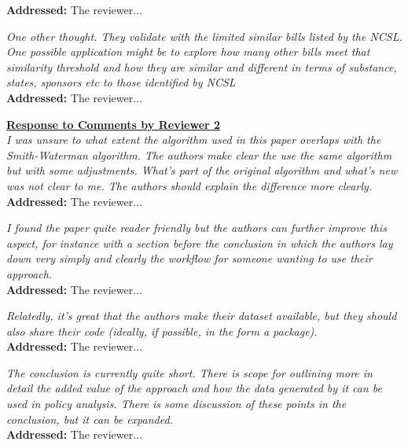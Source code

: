 \documentclass[12pt]{article}
\newcommand{\grey}[1]{{\color{mygrey}#1}}
\begin{document}
\noindent \textcolor{MyGreen}{\textbf{Addressed:}} The reviewer... 

 \grey{\emph{  One other thought. They validate with the limited similar bills listed by the NCSL. One possible application might be to explore how many other bills meet that similarity threshold and how they are similar and different in terms of substance, states, sponsors etc to those identified by NCSL}}\\

\noindent \textcolor{MyGreen}{\textbf{Addressed:}} The reviewer... 

\noindent \underline{\textbf{Response to Comments by Reviewer 2}}\\

 \grey{\emph{   I was unsure to what extent the algorithm used in this paper overlaps with the Smith-Waterman algorithm. The authors make clear the use the same algorithm but with some adjustments. What's part of the original algorithm and what's new was not clear to me. The authors should explain the difference more clearly.}}\\

\noindent \textcolor{MyGreen}{\textbf{Addressed:}} The reviewer... 

 \grey{\emph{  I found the paper quite reader friendly but the authors can further improve this aspect, for instance with a section before the conclusion in which the authors lay down very simply and clearly the workflow for someone wanting to use their approach.}}\\

\noindent \textcolor{MyGreen}{\textbf{Addressed:}} The reviewer... 

 \grey{\emph{ Relatedly, it's great that the authors make their dataset available, but they should also share their code (ideally, if possible, in the form a package).}}\\

\noindent \textcolor{MyGreen}{\textbf{Addressed:}} The reviewer... 

 \grey{\emph{ The conclusion is currently quite short. There is scope for outlining more in detail the added value of the approach and how the data generated by it can be used in policy analysis. There is some discussion of these points in the conclusion, but it can be expanded.}}\\

\noindent \textcolor{MyGreen}{\textbf{Addressed:}} The reviewer... 
\end{document}
